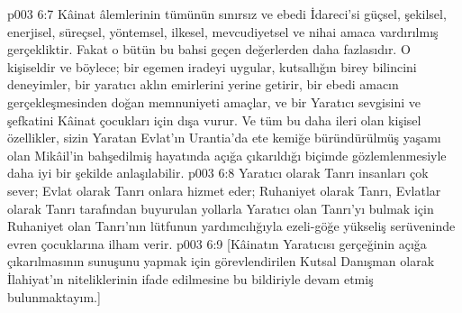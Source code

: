 \vs p003 6:7 Kâinat âlemlerinin tümünün sınırsız ve ebedi İdareci’si güçsel, şekilsel, enerjisel, süreçsel, yöntemsel, ilkesel, mevcudiyetsel ve nihai amaca vardırılmış gerçekliktir. Fakat o bütün bu bahsi geçen değerlerden daha fazlasıdır. O kişiseldir ve böylece; bir egemen iradeyi uygular, kutsallığın birey bilincini deneyimler, bir yaratıcı aklın emirlerini yerine getirir, bir ebedi amacın gerçekleşmesinden doğan memnuniyeti amaçlar, ve bir Yaratıcı sevgisini ve şefkatini Kâinat çocukları için dışa vurur. Ve tüm bu daha ileri olan kişisel özellikler, sizin Yaratan Evlat’ın Urantia’da ete kemiğe büründürülmüş yaşamı olan Mikâil’in bahşedilmiş hayatında açığa çıkarıldığı biçimde gözlemlenmesiyle daha iyi bir şekilde anlaşılabilir.
\vs p003 6:8 Yaratıcı olarak Tanrı insanları çok sever; Evlat olarak Tanrı onlara hizmet eder; Ruhaniyet olarak Tanrı, Evlatlar olarak Tanrı tarafından buyurulan yollarla Yaratıcı olan Tanrı’yı bulmak için Ruhaniyet olan Tanrı’nın lütfunun yardımcılığıyla ezeli\hyp{}göğe yükseliş serüveninde evren çocuklarına ilham verir.
\vs p003 6:9 [Kâinatın Yaratıcısı gerçeğinin açığa çıkarılmasının sunuşunu yapmak için görevlendirilen Kutsal Danışman olarak İlahiyat’ın niteliklerinin ifade edilmesine bu bildiriyle devam etmiş bulunmaktayım.]
